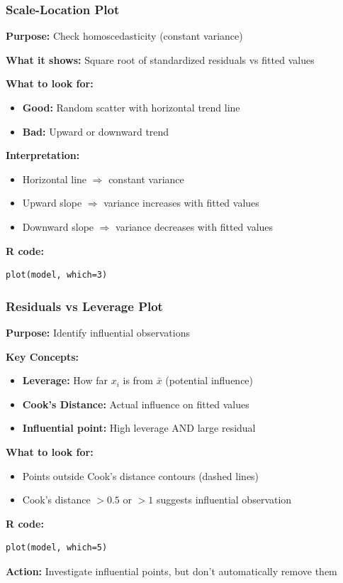 \documentclass{beamer}
\begin{document}
\begin{frame}[fragile]
\frametitle{Scale-Location Plot}
\textbf{Purpose:} Check homoscedasticity (constant variance)

\vspace{0.3cm}
\textbf{What it shows:} Square root of standardized residuals vs fitted values

\vspace{0.3cm}
\textbf{What to look for:}
\begin{itemize}
\item \textbf{Good:} Random scatter with horizontal trend line
\item \textbf{Bad:} Upward or downward trend
\end{itemize}

\vspace{0.5cm}
\textbf{Interpretation:}
\begin{itemize}
\item Horizontal line $\Rightarrow$ constant variance
\item Upward slope $\Rightarrow$ variance increases with fitted values
\item Downward slope $\Rightarrow$ variance decreases with fitted values
\end{itemize}

\vspace{0.3cm}
\textbf{R code:}
\begin{verbatim}
plot(model, which=3)
\end{verbatim}
\end{frame}

\begin{frame}[fragile]
\frametitle{Residuals vs Leverage Plot}
\textbf{Purpose:} Identify influential observations

\vspace{0.3cm}
\textbf{Key Concepts:}
\begin{itemize}
\item \textbf{Leverage:} How far $x_i$ is from $\bar{x}$ (potential influence)
\item \textbf{Cook's Distance:} Actual influence on fitted values
\item \textbf{Influential point:} High leverage AND large residual
\end{itemize}

\vspace{0.5cm}
\textbf{What to look for:}
\begin{itemize}
\item Points outside Cook's distance contours (dashed lines)
\item Cook's distance $> 0.5$ or $> 1$ suggests influential observation
\end{itemize}

\vspace{0.3cm}
\textbf{R code:}
\begin{verbatim}
plot(model, which=5)
\end{verbatim}

\vspace{0.2cm}
\textbf{Action:} Investigate influential points, but don't automatically remove them
\end{frame}
\end{document}
